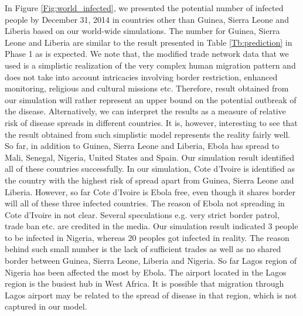 \documentclass[10pt, journal,onecolumn]{IEEEtran}
\begin{document}
In Figure \ref{Fig:world_infected}, we presented the potential number of infected people by December 31, 2014 in countries other than Guinea, Sierra Leone and Liberia based on our world-wide simulations. The number for Guinea, Sierra Leone and Liberia are similar to the result presented in Table \ref{Tb:prediction} in Phase 1 as is expected. We note that, the modified trade network data that we used is a simplistic realization of the very complex human migration pattern and does not take into account intricacies involving border restriction, enhanced monitoring, religious and cultural missions etc. Therefore, result obtained from our simulation  will rather represent  an upper bound on the potential outbreak of the disease. Alternatively, we can interpret the results as a measure of relative risk of disease spreads in different countries. It is, however, interesting to see that the result obtained from such simplistic model represents the reality fairly well. So far, in addition to  Guinea, Sierra Leone and Liberia, Ebola has spread to Mali, Senegal, Nigeria, United States and Spain. Our simulation result identified all of these countries successfully. In our simulation, Cote d'Ivoire is identified as the country with the highest risk of spread apart from Guinea, Sierra Leone and Liberia. However, so far Cote d'Ivoire is Ebola free, even though it shares border will all of these three infected countries. The reason of Ebola not spreading in Cote d'Ivoire in not clear. Several speculations e.g. very strict border patrol, trade ban etc. are credited in the media. Our simulation result indicated 3 people to be infected in Nigeria, whereas 20 peoples got infected in reality. The reason behind such small number is the lack of sufficient trades as well as no shared border between Guinea, Sierra Leone, Liberia and Nigeria. So far Lagos region of Nigeria has been affected the most by Ebola. The airport located in the Lagos region is the busiest hub in West Africa. It is possible that migration through Lagos airport may be related to the spread of disease in that region, which is not captured in our model.
\end{document}
